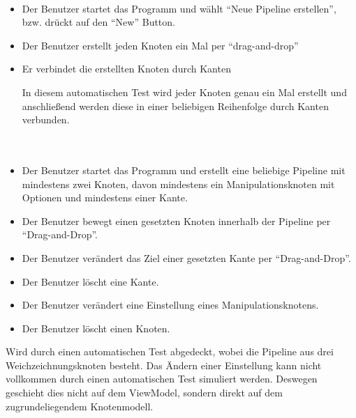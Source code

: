 \paragraph{}
\begin{itemize}
	\item Der Benutzer startet das Programm und wählt ``Neue Pipeline erstellen'', bzw. drückt auf den ``New'' Button.
	\item Der Benutzer erstellt jeden Knoten ein Mal per ``drag-and-drop''
	\item Er verbindet die erstellten Knoten durch Kanten
	
	In diesem automatischen Test wird jeder Knoten genau ein Mal erstellt und anschließend werden diese in einer beliebigen Reihenfolge durch Kanten verbunden.
\end{itemize}

\paragraph{} ~\\

\begin{itemize}
	\item Der Benutzer startet das Programm und erstellt eine beliebige Pipeline mit mindestens zwei Knoten, davon mindestens ein Manipulationsknoten mit Optionen und mindestens einer Kante.
			\item Der Benutzer bewegt einen gesetzten Knoten innerhalb der Pipeline per ``Drag-and-Drop''.
			\item Der Benutzer verändert das Ziel einer gesetzten Kante per ``Drag-and-Drop''.
			\item Der Benutzer löscht eine Kante.
			\item Der Benutzer verändert eine Einstellung eines Manipulationsknotens.
			\item Der Benutzer löscht einen Knoten.
\end{itemize}

Wird durch einen automatischen Test abgedeckt, wobei die Pipeline aus drei Weichzeichnungsknoten besteht. Das Ändern einer Einstellung kann nicht vollkommen durch einen automatischen Test simuliert werden. Deswegen geschieht dies nicht auf dem ViewModel, sondern direkt auf dem zugrundeliegendem Knotenmodell.

\paragraph{} ~\\

